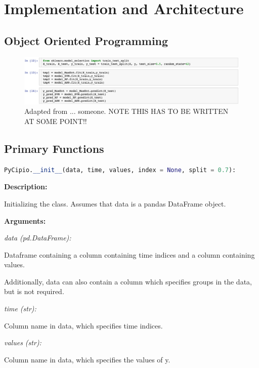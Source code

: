\documentclass{article}
\begin{document}
\section{Implementation and Architecture}

\subsection{Object Oriented Programming}

\begin{figure}[H]
    \centerline{\includegraphics{images/sklearn.jpeg}}
    \caption{Adapted from ... someone. NOTE THIS HAS TO BE WRITTEN AT SOME POINT!!}
\end{figure}

\subsection{Primary Functions}

\begin{lstlisting}[language=Python]
PyCipio.__init__(data, time, values, index = None, split = 0.7):
\end{lstlisting}

\indent \textbf{Description:} 

\indent \indent Initializing the class. Assumes that data is a pandas DataFrame object.

\indent \textbf{Arguments:}

\indent \indent \textit{data (pd.DataFrame):} 

\indent \indent \indent Dataframe containing a column containing time indices and a column containing values. 

\indent \indent \indent Additionally, data can also contain a column which specifies groups in the data, but is not required. 

\indent \indent \textit{time (str):} 

\indent \indent \indent Column name in data, which specifies time indices.

\indent \indent \textit{values (str):} 

\indent \indent \indent Column name in data, which specifies the values of y.
            
\end{document}
